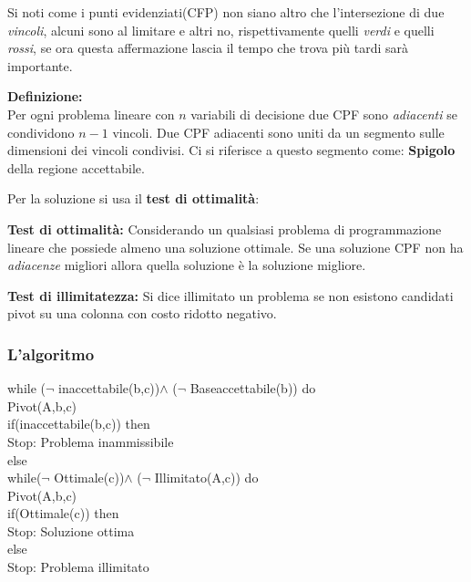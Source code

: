 \documentclass{article}
\begin{document}
Si noti come i punti evidenziati(CFP) non siano altro che l'intersezione di due \textit{vincoli}, alcuni sono al limitare e altri no, rispettivamente quelli \textit{verdi} e quelli \textit{rossi}, se ora questa affermazione lascia il tempo che trova più tardi sarà importante.

\begin{tcolorbox}[breakable]
  \textbf{Definizione:} \\
  Per ogni problema lineare con $n$ variabili di decisione due CPF sono \textit{adiacenti} se condividono $n-1$ vincoli. Due CPF adiacenti sono uniti da un segmento sulle dimensioni dei vincoli condivisi. Ci si riferisce a questo segmento come: \textbf{Spigolo} della regione accettabile.
\end{tcolorbox}

Per la soluzione si usa il \textbf{test di ottimalità}:

\begin{tcolorbox}[breakable]
  \textbf{Test di ottimalità:}
  Considerando un qualsiasi problema di programmazione lineare che possiede almeno una soluzione ottimale. Se una soluzione CPF non ha \textit{adiacenze} migliori allora quella soluzione è la soluzione migliore.
\end{tcolorbox}


\begin{tcolorbox}[breakable]
  \textbf{Test di illimitatezza:}
  Si dice illimitato un problema se non esistono candidati pivot su una colonna con costo ridotto negativo.
\end{tcolorbox}

\subsubsection{L'algoritmo}
\begin{tcolorbox}[breakable]
  while ($\lnot$ inaccettabile(b,c))$\land$ ($\lnot$ Baseaccettabile(b)) do\\
  Pivot(A,b,c)\\
  if(inaccettabile(b,c)) then\\
  Stop: Problema inammissibile\\
  else\\
  while($\lnot$ Ottimale(c))$\land$ ($\lnot$ Illimitato(A,c)) do\\
  Pivot(A,b,c)\\
  if(Ottimale(c)) then\\
  Stop: Soluzione ottima\\
  else\\
  Stop: Problema illimitato\\
\end{tcolorbox}
\end{document}
